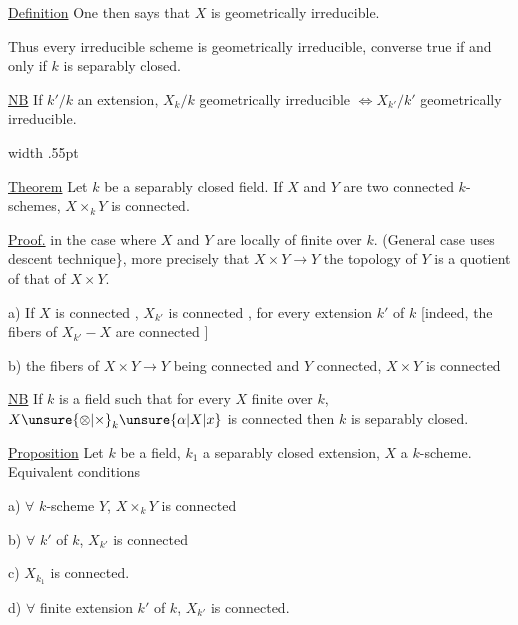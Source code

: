 \uline{Definition} One then says that $X$ is geometrically irreducible.

Thus  every irreducible scheme is geometrically irreducible, converse true if and only if $k$ is separably closed.

\uline{NB} If $k'/k$ an extension, $X_k/k$ geometrically irreducible $\Longleftrightarrow X_{k'}/k'$ geometrically irreducible. 

 

\noindent\vrule width .55pt\hspace{.5em}\begin{minipage}{.92\linewidth}
\uline{Theorem} Let $k$ be a separably closed field. If $X$ and $Y$ are two connected $k$-schemes, $X\times_k Y$ is connected.

\end{minipage}\par
\uline{Proof.} in the case where $X$ and $Y$ are locally of finite  over $k$. (General case uses descent technique\}, more precisely that $X\times Y\longrightarrow Y$ the topology of $Y$ is a quotient of that of $X\times Y$.

a) If $X$ is connected , $X_{k'}$ is connected , for every extension $k'$ of $k$ [indeed, the fibers of $X_{k'}-X$ are connected ]

b) the fibers of $X\times Y\to Y$ being connected  and $Y$ connected, $X\times Y$ is connected

\uline{NB} If $k$ is a field such that for every $X$  finite over $k$, $X\unsure{\otimes|\times}_k \unsure{\alpha|X|x}$ is connected then $k$ is separably closed.

\uline{Proposition} Let $k$ be a field, $k_1$ a separably closed  extension, $X$ a $k$-scheme. Equivalent conditions

a) $\forall$ $k$-scheme $Y$, $X\times_k Y$ is connected

b) $\forall$  $k'$ of $k$, $X_{k'}$ is connected

c)  $X_{k_1}$ is connected.

d) $\forall$ finite  extension $k'$ of $k$, $X_{k'}$ is connected.

